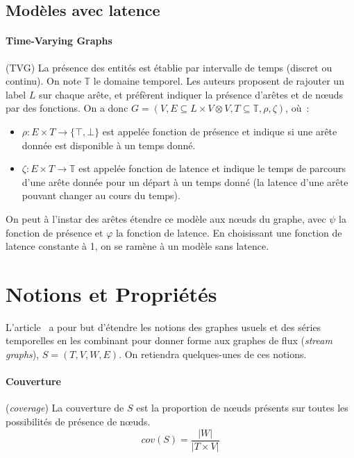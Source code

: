 \documentclass[12pt,a4paper]{article}
\begin{document}
\subsection{Modèles avec latence}

\paragraph{Time-Varying Graphs}\cite{casteigts2012time} (TVG) La présence
des entités est établie par intervalle de temps (discret ou
continu). On note \(\mathbb{T}\) le domaine temporel. Les auteurs
proposent de rajouter un label \(L\) sur chaque arête, et préfèrent
indiquer la présence d'arêtes et de nœuds par des fonctions. On a donc
\(G = (V, E \subseteq L \times V \otimes V, T \subseteq \mathbb{T},
\rho, \zeta)\), où~:
\begin{itemize}
\item \(\rho : E \times T \to \{\top, \bot\}\) est appelée fonction
  de présence et indique si une arête donnée est disponible à un temps
  donné.
\item \(\zeta : E \times T \to \mathbb{T}\) est appelée fonction de
  latence et indique le temps de parcours d'une arête donnée pour un
  départ à un temps donné (la latence d'une arête pouvant changer au
  cours du temps).
\end{itemize}

On peut à l'instar des arêtes étendre ce modèle aux nœuds du graphe,
avec \(\psi\) la fonction de présence et \(\varphi\) la fonction de
latence. En choisissant une fonction de latence constante à 1, on se
ramène à un modèle sans latence.

\section{Notions et Propriétés}

L'article~\cite{latapy2017stream} a pour but d'étendre les notions des
graphes usuels et des séries temporelles en les combinant pour donner
forme aux graphes de flux (\textit{stream graphs}),
\(S = (T, V, W, E)\). On retiendra quelques-unes de ces notions.

\paragraph{Couverture} (\textit{coverage}) La couverture de \(S\) est
la proportion de nœuds présents sur toutes les possibilités de
présence de nœuds.
\[cov(S) = \frac{|W|}{|T \times V|}\]
\end{document}
